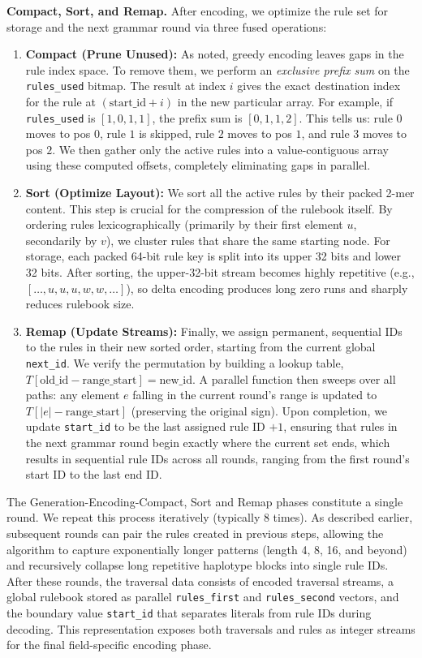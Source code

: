 \noindent \textbf{Compact, Sort, and Remap.}
After encoding, we optimize the rule set for storage and the next grammar round via three fused operations:
\begin{enumerate}[noitemsep, topsep=2pt, leftmargin=*]
  \item \textbf{Compact (Prune Unused):} As noted, greedy encoding leaves gaps in the rule index space. To remove them, we perform an \emph{exclusive prefix sum} on the \texttt{rules\_used} bitmap. The result at index $i$ gives the exact destination index for the rule at $(\text{start\_id} + i)$ in the new particular array. For example, if \texttt{rules\_used} is $[1, 0, 1, 1]$, the prefix sum is $[0, 1, 1, 2]$. This tells us: rule $0$ moves to pos $0$, rule $1$ is skipped, rule $2$ moves to pos $1$, and rule $3$ moves to pos $2$. We then gather only the active rules into a value-contiguous array using these computed offsets, completely eliminating gaps in parallel.

  \item \textbf{Sort (Optimize Layout):} We sort all the active rules by their packed 2-mer content. This step is crucial for the compression of the rulebook itself. By ordering rules lexicographically (primarily by their first element $u$, secondarily by $v$), we cluster rules that share the same starting node. For storage, each packed 64-bit rule key is split into its upper 32 bits and lower 32 bits. After sorting, the upper-32-bit stream becomes highly repetitive (e.g., $[\ldots, u, u, u, w, w, \ldots]$), so delta encoding produces long zero runs and sharply reduces rulebook size.


  \item \textbf{Remap (Update Streams):} Finally, we assign permanent, sequential IDs to the rules in their new sorted order, starting from the current global \texttt{next\_id}. We verify the permutation by building a lookup table, $T[\text{old\_id} - \text{range\_start}] = \text{new\_id}$. A parallel function then sweeps over all paths: any element $e$ falling in the current round's range is updated to $T[|e| - \text{range\_start}]$ (preserving the original sign). Upon completion, we update \texttt{start\_id} to be the last assigned rule ID $+ 1$, ensuring that rules in the next grammar round begin exactly where the current set ends, which results in sequential rule IDs across all rounds, ranging from the first round's start ID to the last end ID.
\end{enumerate}

The Generation-Encoding-Compact, Sort and Remap phases constitute a single round. We repeat this process iteratively (typically 8 times). As described earlier, subsequent rounds can pair the rules created in previous steps, allowing the algorithm to capture exponentially longer patterns (length 4, 8, 16, and beyond) and recursively collapse long repetitive haplotype blocks into single rule IDs.
After these rounds, the traversal data consists of encoded traversal streams, a global rulebook stored as parallel \texttt{rules\_first} and \texttt{rules\_second} vectors, and the boundary value \texttt{start\_id} that separates literals from rule IDs during decoding. This representation exposes both traversals and rules as integer streams for the final field-specific encoding phase.

